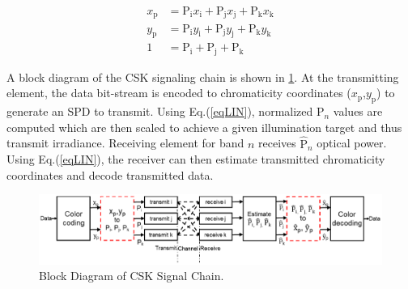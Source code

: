 \documentclass[10pt,letterpaper]{article}
\begin{document}
\begin{equation}
	\begin{aligned}
	x_{\text{p}} &= \text{P}_{\text{i}}x_{\text{i}} + \text{P}_{\text{j}}x_{\text{j}} + \text{P}_{\text{k}}x_{\text{k}}\\
	y_{\text{p}} &= \text{P}_{\text{i}}y_{\text{i}} + \text{P}_{\text{j}}y_{\text{j}} + \text{P}_{\text{k}}y_{\text{k}}\\
	1 &= \text{P}_{\text{i}} + \text{P}_{\text{j}} + \text{P}_{\text{k}}
\end{aligned}
\label{eqLIN}
\end{equation}

A block diagram of the CSK signaling chain is shown in \figurename\ref{figCSKBD}. At the transmitting element, the data bit-stream is encoded to chromaticity coordinates ($x_{\text{p}}$,$y_{\text{p}}$) to generate an SPD to transmit. Using Eq.(\ref{eqLIN}), normalized P$_{n}$ values are computed which are then scaled to achieve a given illumination target and thus transmit irradiance. Receiving element for band $n$ receives $\hat{\text{P}}_{n}$ optical power. Using Eq.(\ref{eqLIN}), the receiver can then estimate transmitted chromaticity coordinates and decode transmitted data.

\begin{figure}[t]
	\centering
		\includegraphics[trim={2.34in 2.78in 1.76in 2.47in}, clip=true, width=5.25in]{CSKBlockDiagram.eps}
	\caption{Block Diagram of CSK Signal Chain.}
	\label{figCSKBD}
\end{figure}
\end{document}
